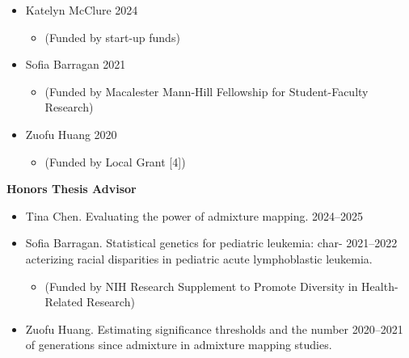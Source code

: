 \documentclass[margin]{res}
\begin{document}
\begin{resume}
\begin{itemize}
\item Katelyn McClure \hfill 2024 
	\begin{itemize}[leftmargin=-0in] \vspace{-0.2cm}
	\item[]\begin{footnotesize}(Funded by start-up funds) \end{footnotesize}
	\end{itemize}

\item Sofia Barragan \hfill 2021 
	\begin{itemize}[leftmargin=-0in] \vspace{-0.2cm}
	\item[]\begin{footnotesize}(Funded by Macalester Mann-Hill Fellowship for Student-Faculty Research) \end{footnotesize}
	\end{itemize}

\item Zuofu Huang \hfill 2020 
	\begin{itemize}[leftmargin=-0in] \vspace{-0.2cm}
	\item[]\begin{footnotesize}(Funded by Local Grant [4]) \end{footnotesize}
	\end{itemize}
\end{itemize}


\textbf{Honors Thesis Advisor}
\begin{itemize}

\item Tina Chen. Evaluating the power of admixture mapping. \hfill 2024--2025

\item Sofia Barragan. Statistical genetics for pediatric leukemia: char- \hfill 2021--2022 \\ acterizing racial disparities in pediatric acute lymphoblastic leukemia.
	\begin{itemize}[leftmargin=-0in]  \vspace{-0.2cm}
	\item[]\begin{footnotesize}(Funded by NIH Research Supplement to Promote Diversity in Health-Related Research) \end{footnotesize}
	\end{itemize}

\item Zuofu Huang. Estimating significance thresholds and the number  \hfill 2020--2021 \\of generations since admixture in admixture mapping studies. %


\end{itemize}
\end{resume}
\end{document}
